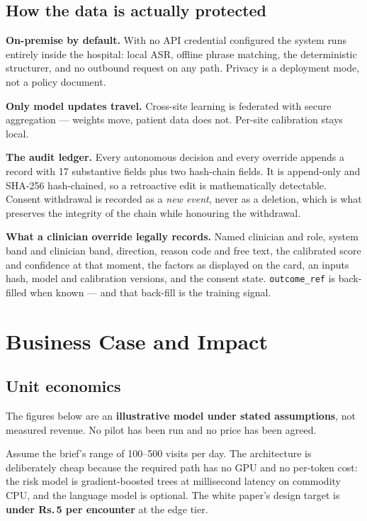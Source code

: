 \documentclass[10pt,a4paper,twocolumn]{article}
\newcommand{\cm}[1]{\texttt{#1}}
\begin{document}
\subsection{How the data is actually protected}
\textbf{On-premise by default.} With no API credential configured the system runs entirely inside
the hospital: local ASR, offline phrase matching, the deterministic structurer, and no outbound
request on any path. Privacy is a deployment mode, not a policy document.

\textbf{Only model updates travel.} Cross-site learning is federated with secure aggregation ---
weights move, patient data does not. Per-site calibration stays local.

\textbf{The audit ledger.} Every autonomous decision and every override appends a record with 17
substantive fields plus two hash-chain fields. It is append-only and SHA-256 hash-chained, so a
retroactive edit is mathematically detectable. Consent withdrawal is recorded as a \emph{new event},
never as a deletion, which is what preserves the integrity of the chain while honouring the
withdrawal.

\textbf{What a clinician override legally records.} Named clinician and role, system band and
clinician band, direction, reason code and free text, the calibrated score and confidence at that
moment, the factors as displayed on the card, an inputs hash, model and calibration versions, and
the consent state. \cm{outcome\_ref} is back-filled when known --- and that back-fill is the
training signal.

\section{Business Case and Impact}
\label{sec:business}

\subsection{Unit economics}
\begin{tcolorbox}[mpwarn]
The figures below are an \textbf{illustrative model under stated assumptions}, not measured
revenue. No pilot has been run and no price has been agreed.
\end{tcolorbox}

Assume the brief's range of 100--500 visits per day. The architecture is deliberately cheap because
the required path has no GPU and no per-token cost: the risk model is gradient-boosted trees at
millisecond latency on commodity CPU, and the language model is optional. The white paper's design
target is \textbf{under Rs.\,5 per encounter} at the edge tier.
\end{document}
